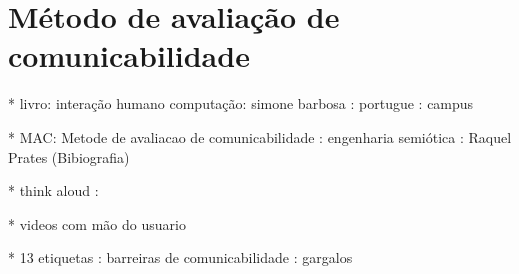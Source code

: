 \chapter{Método de avaliação de comunicabilidade}


* livro: interação humano computação: simone barbosa : portugue : campus

* MAC: Metode de avaliacao de comunicabilidade : engenharia semiótica : Raquel Prates (Bibiografia)

* think aloud : 

* videos com mão do usuario

* 13 etiquetas : barreiras de comunicabilidade : gargalos



